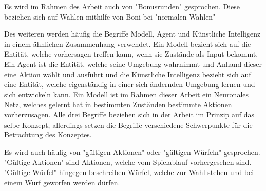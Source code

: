 Es wird im Rahmen des Arbeit auch von "Bonusrunden" gesprochen. Diese beziehen sich auf Wahlen mithilfe von Boni bei "normalen Wahlen"

Des weiteren werden häufig die Begriffe Modell, Agent und Künstliche Intelligenz in einem ähnlichen Zusammenhang verwendet. Ein Modell bezieht sich auf die Entität, welche vorhersagen treffen kann, wenn sie Zustände als Input bekommt. Ein Agent ist die Entität, welche seine Umgebung wahrnimmt und Anhand dieser eine Aktion wählt und ausführt und die Künstliche Intelligenz bezieht sich auf eine Entität, welche eigenständig in einer sich ändernden Umgebung lernen und sich entwickeln kann. Ein Modell ist im Rahmen dieser Arbeit ein Neuronales Netz, welches gelernt hat in bestimmten Zuständen bestimmte Aktionen vorherzusagen. Alle drei Begriffe beziehen sich in der Arbeit im Prinzip auf das selbe Konzept, allerdings setzen die Begriffe verschiedene Schwerpunkte für die Betrachtung des Konzeptes.

Es wird auch häufig von "gültigen Aktionen" oder "gültigen Würfeln" gesprochen. "Gültige Aktionen" sind Aktionen, welche vom Spielablauf vorhergesehen sind. "Gültige Würfel" hingegen beschreiben Würfel, welche zur Wahl stehen und bei einem Wurf geworfen werden dürfen.
